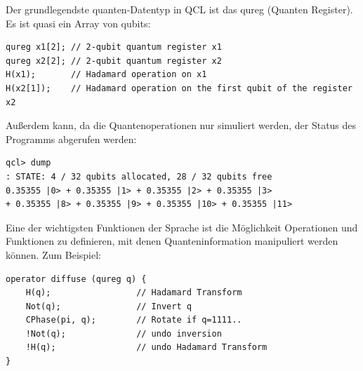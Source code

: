 Der grundlegendste quanten-Datentyp in QCL ist das qureg (Quanten Register).
Es ist quasi ein Array von qubits: \cite{quantenprogwiki}

\begin{lstlisting}
qureg x1[2]; // 2-qubit quantum register x1
qureg x2[2]; // 2-qubit quantum register x2
H(x1);       // Hadamard operation on x1
H(x2[1]);    // Hadamard operation on the first qubit of the register x2
\end{lstlisting}

\newpage

Außerdem kann, da die Quantenoperationen nur simuliert werden, der Status des Programms abgerufen werden: \cite{quantenprogwiki}

\begin{lstlisting}
qcl> dump
: STATE: 4 / 32 qubits allocated, 28 / 32 qubits free
0.35355 |0> + 0.35355 |1> + 0.35355 |2> + 0.35355 |3>
+ 0.35355 |8> + 0.35355 |9> + 0.35355 |10> + 0.35355 |11>
\end{lstlisting}

Eine der wichtigsten Funktionen der Sprache ist die Möglichkeit Operationen und Funktionen zu definieren, mit denen Quanteninformation manipuliert werden können.
Zum Beispiel: \cite{quantenprogwiki}

\begin{lstlisting}
operator diffuse (qureg q) {
    H(q);                 // Hadamard Transform
    Not(q);               // Invert q
    CPhase(pi, q);        // Rotate if q=1111..
    !Not(q);              // undo inversion
    !H(q);                // undo Hadamard Transform
}
\end{lstlisting}
